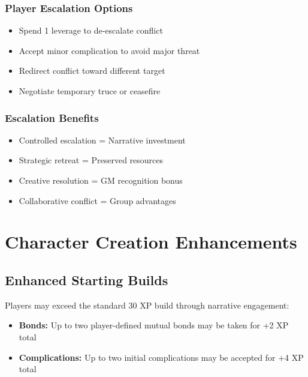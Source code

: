 \subsubsection{Player Escalation Options}

\begin{itemize}
\item Spend 1 leverage to de-escalate conflict
\item Accept minor complication to avoid major threat
\item Redirect conflict toward different target
\item Negotiate temporary truce or ceasefire
\end{itemize}

\subsubsection{Escalation Benefits}

\begin{itemize}
\item Controlled escalation = Narrative investment
\item Strategic retreat = Preserved resources
\item Creative resolution = GM recognition bonus
\item Collaborative conflict = Group advantages
\end{itemize}

\section{Character Creation Enhancements}

\subsection{Enhanced Starting Builds}

Players may exceed the standard 30 XP build through narrative engagement:

\begin{itemize}
    \item \textbf{Bonds:} Up to two player-defined mutual bonds may be taken for +2 XP total
    \item \textbf{Complications:} Up to two initial complications may be accepted for +4 XP total
\end{itemize}

